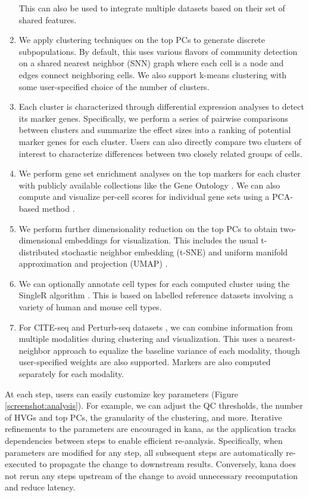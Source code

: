 \documentclass{article}
\begin{document}
\begin{enumerate}
This can also be used to integrate multiple datasets based on their set of shared features.
\item We apply clustering techniques on the top PCs to generate discrete subpopulations.
By default, this uses various flavors of community detection on a shared nearest neighbor (SNN) graph where each cell is a node and edges connect neighboring cells.
We also support k-means clustering with some user-specified choice of the number of clusters.
\item Each cluster is characterized through differential expression analyses to detect its marker genes.
Specifically, we perform a series of pairwise comparisons between clusters and summarize the effect sizes into a ranking of potential marker genes for each cluster.
Users can also directly compare two clusters of interest to characterize differences between two closely related groups of cells.
\item We perform gene set enrichment analyses on the top markers for each cluster with publicly available collections like the Gene Ontology \cite{ashburner2000go}. 
We can also compute and visualize per-cell scores for individual gene sets using a PCA-based method \cite{bueno2016comprehensive}.
\item We perform further dimensionality reduction on the top PCs to obtain two-dimensional embeddings for visualization. 
This includes the usual t-distributed stochastic neighbor embedding (t-SNE) and uniform manifold approximation and projection (UMAP) \cite{maaten2014accelerating,mcinnes2018umap}.
\item We can optionally annotate cell types for each computed cluster using the SingleR algorithm \cite{aran2019reference}.
This is based on labelled reference datasets involving a variety of human and mouse cell types.
\item For CITE-seq \cite{stoeckius2017simultaneous} and Perturb-seq datasets \cite{dixit2016perturbseq}, we can combine information from multiple modalities during clustering and visualization.
This uses a nearest-neighbor approach to equalize the baseline variance of each modality, though user-specified weights are also supported. 
Markers are also computed separately for each modality.
\end{enumerate}

At each step, users can easily customize key parameters (Figure \ref{screenshot:analysis}).
For example, we can adjust the QC thresholds, the number of HVGs and top PCs, the granularity of the clustering, and more. 
Iterative refinements to the parameters are encouraged in kana, as the application tracks dependencies between steps to enable efficient re-analysis.
Specifically, when parameters are modified for any step, all subsequent steps are automatically re-executed to propagate the change to downstream results.
Conversely, kana does not rerun any steps upstream of the change to avoid unnecessary recomputation and reduce latency.
\end{document}
